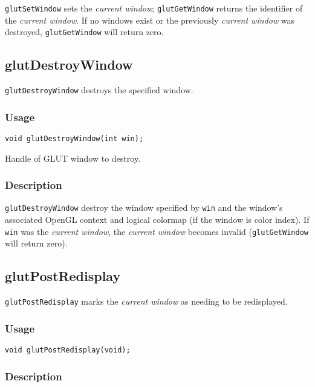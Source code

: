 {\tt glutSetWindow} sets the {\em current window}; {\tt glutGetWindow}
returns the identifier of the {\em current window}.
If no windows exist or the previously {\em current window} was destroyed, {\tt glutGetWindow}
will return zero.

\subsection{glutDestroyWindow}

{\tt glutDestroyWindow} destroys the specified window.

\subsubsection*{Usage}
\begin{verbatim}
void glutDestroyWindow(int win);
\end{verbatim}
\begin{description}
\itemsep 0in
\item[\tt win]
Handle of GLUT window to destroy.
\end{description}

\subsubsection*{Description}

{\tt glutDestroyWindow} destroy the window specified by {\tt win} and the window's
associated OpenGL context and logical colormap (if the window is color index).  If {\tt win} was
the {\em current window}, the {\em current window} becomes
invalid ({\tt glutGetWindow} will return zero).

\subsection{glutPostRedisplay}

{\tt glutPostRedisplay} marks the {\em current window} as needing to be redisplayed.

\subsubsection*{Usage}
\begin{verbatim}
void glutPostRedisplay(void);
\end{verbatim}

\subsubsection*{Description}

